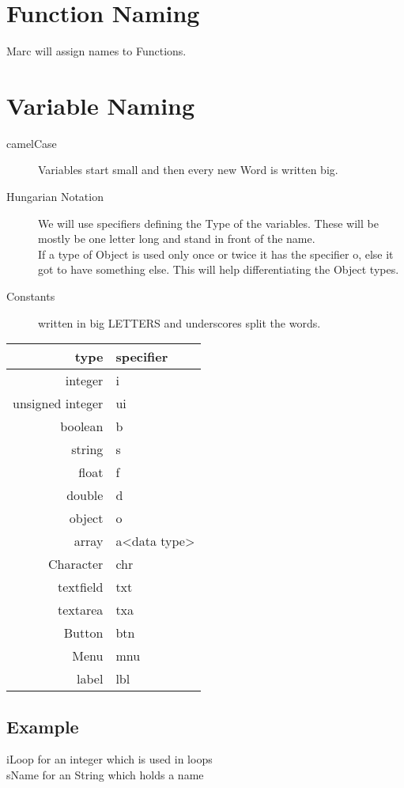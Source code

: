\documentclass[fontsize=11,DIV=10]{scrartcl}
\begin{document}
\section{Function Naming}
	Marc will assign names to Functions.


\section{Variable Naming}
	\begin{description}
		\item[camelCase]{
			Variables start small and then every new Word is written big.
		}
		\item[Hungarian Notation]{
			We will use specifiers defining the Type of the variables.
			These will be mostly be one letter long and stand in front of the name.\\
			If a type of Object is used only once or twice it has the specifier o, else it got to have something else.
			This will help differentiating the Object types.
		}
		\item[Constants]{
			written in big LETTERS and underscores split the words.
		}
	\end{description}
	\begin{tabular}{r l}
		\toprule
		type & specifier \\ \midrule
		integer & i \\
		unsigned integer & ui \\
		boolean & b \\
		string & s \\
		float & f \\
		double & d \\
		object\footnotemark{} & o \\
		array & a<data type> \\

		Character & chr \\

		textfield & txt \\
		textarea & txa \\
		Button & btn \\
		Menu & mnu \\
		label & lbl \\ \bottomrule
	\end{tabular}
	\subsection{Example}
		iLoop for an integer which is used in loops \\
		sName for an String which holds a name \\
\end{document}
